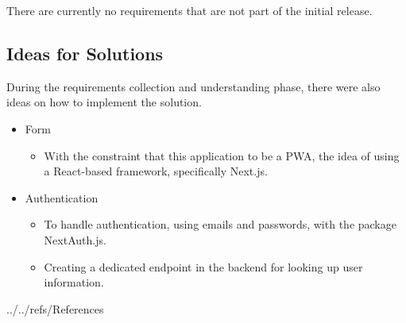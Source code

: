 \documentclass[12pt]{article}
\begin{document}
There are currently no requirements that are not part of the initial release.

\subsection{Ideas for Solutions}

During the requirements collection and understanding phase, there were also ideas on how to
implement the solution.

\begin{itemize}
	\item Form
	      \begin{itemize}
		      \item With the constraint that this application to be a PWA, the idea of using a React-based framework,
		            specifically Next.js.
	      \end{itemize}
	\item Authentication
	      \begin{itemize}
		      \item To handle authentication, using emails and passwords, with the package NextAuth.js.
		      \item Creating a dedicated endpoint in the backend for looking up user information.
	      \end{itemize}
\end{itemize}

\newpage



 {../../refs/References}

\newpage

\end{document}
